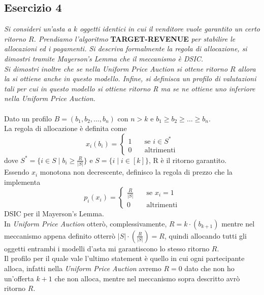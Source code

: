 \documentclass{article}
\begin{document}
        \subsection{Esercizio 4}
            \textit{Si consideri un'asta a $ k $ oggetti identici in cui il venditore vuole garantito un certo ritorno $ R $. Prendiamo l'algoritmo} \textbf{TARGET-REVENUE} \textit{per stabilire le allocazioni ed i pagamenti. Si descriva formalmente la regola di allocazione, si dimostri tramite Mayerson's Lemma che il meccanismo è DSIC.}\\
            \textit{Si dimostri inoltre che se nella Uniform Price Auction si ottene ritorno $ R $ allora la si ottiene anche in questo modello. Infine, si definisca un profilo di valutazioni tali per cui in questo modello si ottiene ritorno R ma se ne ottiene uno inferiore nella Uniform Price Auction.}\\
            \\
            Dato un profilo $ B = (b_1, b_2, \dots, b_n) $ con $ n > k $ e $ b_1 \geq b_2 \geq \dots \geq b_n $.\\
            La regola di allocazione è definita come
            \[
                x_i(b_i) = \begin{cases}
                    1\quad &\text{se } i \in S^*\\
                    0\quad &\text{altrimenti}
                \end{cases}    
            \]
            dove $ S^* = \{ i \in S\; \vert\; b_i \geq \frac{R}{\vert S \vert} \} $ e $ S = \{ i\; \vert\; i \in [k] \} $, R è il ritorno garantito.\\
            Essendo $ x_i $ monotona non decrescente, definisco la regola di prezzo che la implementa
            \[
                p_i(x_i) = \begin{cases}
                    \frac{R}{\vert S \vert}\quad &\text{se } x_i = 1\\
                    0\quad &\text{altrimenti}
                \end{cases}    
            \]
            DSIC per il Mayerson's Lemma.\\
            In \textit{Uniform Price Auction} otterò, complessivamente, $ R = k \cdot (b_{k + 1}) $ mentre nel meccanismo appena definito otterrò $ \vert S \vert \cdot (\frac{R}{\vert S \vert}) = R $, quindi allocando tutti gli oggetti entrambi i modelli d'asta mi garantiscono lo stesso ritorno $ R $.\\
            Il profilo per il quale vale l'ultimo statement è quello in cui ogni partecipante alloca, infatti nella \textit{Uniform Price Auction} avremo $ R = 0 $ dato che non ho un'offerta $ k + 1 $ che non alloca, mentre nel meccanismo sopra descritto avrò ritorno $ R $.  
    \newpage
\end{document}
